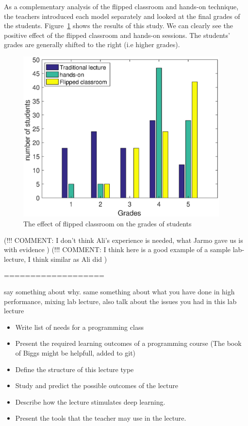 \documentclass{article}
\begin{document}
As a complementary analysis of the flipped classroom and hands-on
technique, the teachers introduced each model separately and looked at
the final grades of the students. Figure~\ref{fig:grades} shows the
results of this study. We can clearly see the positive effect of the
flipped classroom and hands-on sessions. The students' grades are
generally shifted to the right (i.e higher grades).

\begin{figure}[htbp]
	\centering
	\includegraphics[width=0.95\textwidth]{fliped_effect.eps}
	\caption{The effect of flipped classroom on the grades of students}
	\label{fig:grades}
\end{figure}
(!!! COMMENT: I don't think Ali's experience is needed, what Jarmo
gave us is with evidence )
(!!! COMMENT: I think here is a good example of a sample lab-lecture, I think
similar as Ali did )



===================

say something about why.
same something about what you have done in high performance, mixing lab lecture,
also talk about the issues you had in this lab lecture
\begin{itemize}
	\item Write list of needs for a programming class
	\item Present the required learning outcomes of a programming
          course (The book of Biggs might be helpfull, added to git)
	\item Define the structure of this lecture type
	\item Study and predict the possible outcomes of the lecture
	\item Describe how the lecture stimulates deep learning.
	\item Present the tools that the teacher may use in the lecture.
\end{itemize}
\end{document}
